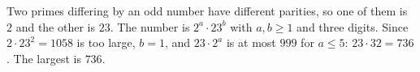 Two primes differing by an odd number have different parities, so one of them is $2$ and the other is $23$. The number is $2^a\cdot23^b$ with $a,b\ge1$ and three digits. Since $2\cdot23^2=1058$ is too large, $b=1$, and $23\cdot2^a$ is at most $999$ for $a\le5$: $23\cdot32=736$. The largest is $\boxed{736}$.
